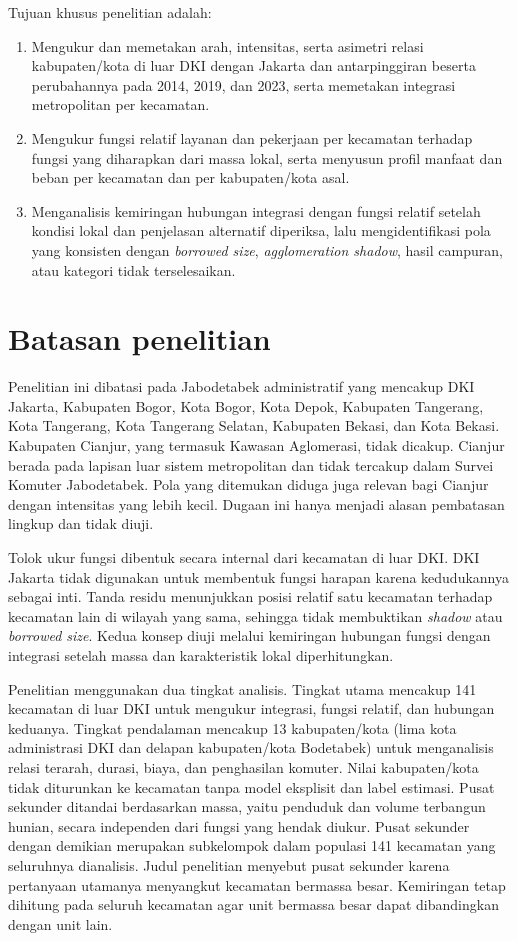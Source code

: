 \documentclass[12pt,a4paper,oneside,openany,indonesian]{report}
\begin{document}
Tujuan khusus penelitian adalah:

\begin{enumerate}
  \item Mengukur dan memetakan arah, intensitas, serta asimetri relasi kabupaten/kota di luar DKI dengan Jakarta dan antarpinggiran beserta perubahannya pada 2014, 2019, dan 2023, serta memetakan integrasi metropolitan per kecamatan.
  \item Mengukur fungsi relatif layanan dan pekerjaan per kecamatan terhadap fungsi yang diharapkan dari massa lokal, serta menyusun profil manfaat dan beban per kecamatan dan per kabupaten/kota asal.
  \item Menganalisis kemiringan hubungan integrasi dengan fungsi relatif setelah kondisi lokal dan penjelasan alternatif diperiksa, lalu mengidentifikasi pola yang konsisten dengan \textit{borrowed size}, \textit{agglomeration shadow}, hasil campuran, atau kategori tidak terselesaikan.
\end{enumerate}

\section{Batasan penelitian}

Penelitian ini dibatasi pada Jabodetabek administratif yang mencakup DKI Jakarta, Kabupaten Bogor, Kota Bogor, Kota Depok, Kabupaten Tangerang, Kota Tangerang, Kota Tangerang Selatan, Kabupaten Bekasi, dan Kota Bekasi. Kabupaten Cianjur, yang termasuk Kawasan Aglomerasi, tidak dicakup. Cianjur berada pada lapisan luar sistem metropolitan dan tidak tercakup dalam Survei Komuter Jabodetabek. Pola yang ditemukan diduga juga relevan bagi Cianjur dengan intensitas yang lebih kecil. Dugaan ini hanya menjadi alasan pembatasan lingkup dan tidak diuji.

Tolok ukur fungsi dibentuk secara internal dari kecamatan di luar DKI. DKI Jakarta tidak digunakan untuk membentuk fungsi harapan karena kedudukannya sebagai inti. Tanda residu menunjukkan posisi relatif satu kecamatan terhadap kecamatan lain di wilayah yang sama, sehingga tidak membuktikan \emph{shadow} atau \emph{borrowed size}. Kedua konsep diuji melalui kemiringan hubungan fungsi dengan integrasi setelah massa dan karakteristik lokal diperhitungkan.

Penelitian menggunakan dua tingkat analisis. Tingkat utama mencakup 141 kecamatan di luar DKI untuk mengukur integrasi, fungsi relatif, dan hubungan keduanya. Tingkat pendalaman mencakup 13 kabupaten/kota (lima kota administrasi DKI dan delapan kabupaten/kota Bodetabek) untuk menganalisis relasi terarah, durasi, biaya, dan penghasilan komuter. Nilai kabupaten/kota tidak diturunkan ke kecamatan tanpa model eksplisit dan label estimasi. Pusat sekunder ditandai berdasarkan massa, yaitu penduduk dan volume terbangun hunian, secara independen dari fungsi yang hendak diukur. Pusat sekunder dengan demikian merupakan subkelompok dalam populasi 141 kecamatan yang seluruhnya dianalisis. Judul penelitian menyebut pusat sekunder karena pertanyaan utamanya menyangkut kecamatan bermassa besar. Kemiringan tetap dihitung pada seluruh kecamatan agar unit bermassa besar dapat dibandingkan dengan unit lain.
\end{document}
